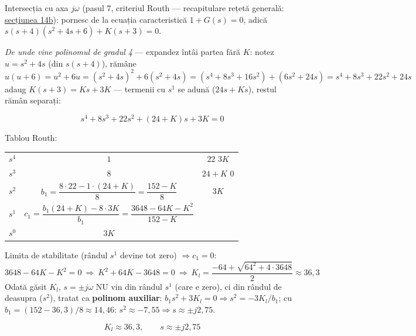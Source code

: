 \documentclass[10pt,a4paper]{article}
\begin{document}
Intersecția cu axa $j\omega$ (pasul 7, criteriul Routh — recapitulare rețetă generală: \hyperref[sec:14b]{secțiunea 14b}): pornesc de la ecuația caracteristică $1{+}G(s){=}0$, adică $s(s{+}4)(s^2{+}4s{+}6)+K(s{+}3)=0$.

\textit{De unde vine polinomul de gradul 4} — expandez întâi partea fără $K$: notez $u{=}s^2{+}4s$ (din $s(s{+}4)$), rămâne
$$u(u{+}6)=u^2+6u=(s^2{+}4s)^2+6(s^2{+}4s)=(s^4{+}8s^3{+}16s^2)+(6s^2{+}24s)=s^4+8s^3+22s^2+24s$$
adaug $K(s{+}3){=}Ks{+}3K$ — termenii cu $s^1$ se adună ($24s{+}Ks$), restul rămân separați:
\begin{keyeq}\color{red!65!black}
$$s^4+8s^3+22s^2+(24+K)s+3K=0$$
\end{keyeq}

Tablou Routh:
\begin{center}
\begin{tabular}{c|cc}
$s^4$ & $1$ & $22$ \quad $3K$\\
$s^3$ & $8$ & $24{+}K$ \quad $0$\\
$s^2$ & $b_1{=}\dfrac{8{\cdot}22-1{\cdot}(24{+}K)}8{=}\dfrac{152-K}8$ & $3K$\\
$s^1$ & $c_1{=}\dfrac{b_1(24{+}K)-8{\cdot}3K}{b_1}{=}\dfrac{3648-64K-K^2}{152-K}$ & \\
$s^0$ & $3K$ &
\end{tabular}
\end{center}

Limita de stabilitate (rândul $s^1$ devine tot zero) $\Rightarrow c_1{=}0$:
$$3648-64K-K^2=0\ \Rightarrow\ K^2+64K-3648=0\ \Rightarrow\ K_l=\dfrac{-64+\sqrt{64^2+4{\cdot}3648}}2\approx36{,}3$$
Odată găsit $K_l$, $s{=}\pm j\omega$ NU vin din rândul $s^1$ (care e zero), ci din rândul de deasupra ($s^2$), tratat ca \textbf{polinom auxiliar}: $b_1s^2+3K_l=0\Rightarrow s^2=-3K_l/b_1$; cu $b_1{=}(152{-}36{,}3)/8\approx14{,}46$: $s^2\approx-7{,}55\Rightarrow s\approx\pm j2{,}75$.
\begin{keyeq}\color{red!65!black}
$$K_l\approx36{,}3,\qquad s\approx\pm j2{,}75$$
\end{keyeq}
\end{document}
